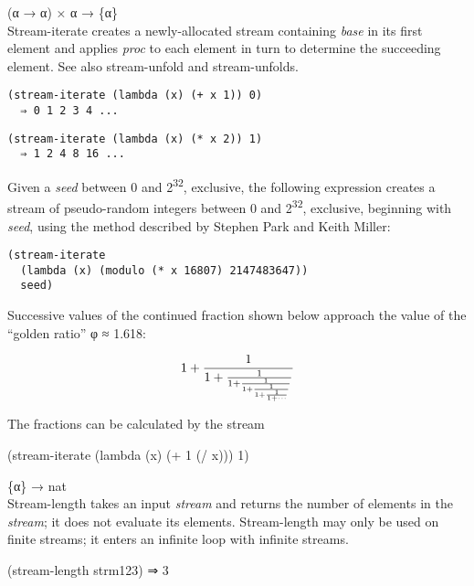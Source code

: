 \begin{entry}{%
  }

  (α → α) × α → \{α\}\\
  Stream-iterate creates a newly-allocated stream containing
  \emph{base} in its first element and applies \emph{proc} to each
  element in turn to determine the succeeding element. See also
  stream-unfold and stream-unfolds.

\begin{verbatim}
(stream-iterate (lambda (x) (+ x 1)) 0)
  ⇒ 0 1 2 3 4 ...
\end{verbatim}

\begin{verbatim}
(stream-iterate (lambda (x) (* x 2)) 1)
  ⇒ 1 2 4 8 16 ...
\end{verbatim}

  Given a \emph{seed} between 0 and 2\textsuperscript{32}, exclusive,
  the following expression creates a stream of pseudo-random integers
  between 0 and 2\textsuperscript{32}, exclusive, beginning with
  \emph{seed}, using the method described by Stephen Park and Keith
  Miller:

\begin{verbatim}
(stream-iterate
  (lambda (x) (modulo (* x 16807) 2147483647))
  seed)
\end{verbatim}

  Successive values of the continued fraction shown below approach the
  value of the ``golden ratio'' φ ≈ 1.618:



$$ 1 + {1\over{1 + {1\over{1 + {1\over{1 + {1\over{1 + {1\over{1 +
                    \cdots}}}}}}}}}}$$


  The fractions can be calculated by the stream

  (stream-iterate (lambda (x) (+ 1 (/ x))) 1)
\end{entry}

\begin{entry}{%
  }

  \{α\} → nat\\
  Stream-length takes an input \emph{stream} and returns the number of
  elements in the \emph{stream}; it does not evaluate its elements.
  Stream-length may only be used on finite streams; it enters an
  infinite loop with infinite streams.

  (stream-length strm123) ⇒ 3
\end{entry}


